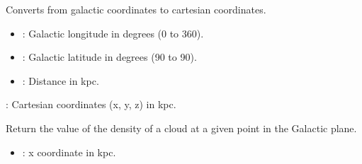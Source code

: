 \documentclass[letterpaper,10pt,english]{sphinxmanual}
\begin{document}
\begin{fulllineitems}
\begin{fulllineitems}
\label{\detokenize{ModelHelper:ModelHelper.ModelHelper.convert_galactic_to_cartesian_3D}}
\pysigstartsignatures
{}
\pysigstopsignatures
\sphinxAtStartPar
Converts from galactic coordinates to cartesian coordinates.
\begin{description}
\begin{itemize}
\item {} 
\sphinxAtStartPar
{}: Galactic longitude in degrees (0 to 360).

\item {} 
\sphinxAtStartPar
{}: Galactic latitude in degrees (\sphinxhyphen{}90 to 90).

\item {} 
\sphinxAtStartPar
{}: Distance in kpc.

\end{itemize}

\sphinxAtStartPar
{} : Cartesian coordinates (x, y, z) in kpc.

\end{description}

\end{fulllineitems}


\begin{fulllineitems}
\label{\detokenize{ModelHelper:ModelHelper.ModelHelper.gauss3d}}
\pysigstartsignatures
{}
\pysigstopsignatures
\sphinxAtStartPar
Return the value of the density of a cloud at a given point in the Galactic plane.
\begin{description}
\begin{itemize}
\item {} 
\sphinxAtStartPar
{}: x coordinate in kpc.


\end{itemize}
\end{description}
\end{fulllineitems}
\end{fulllineitems}
\end{document}
